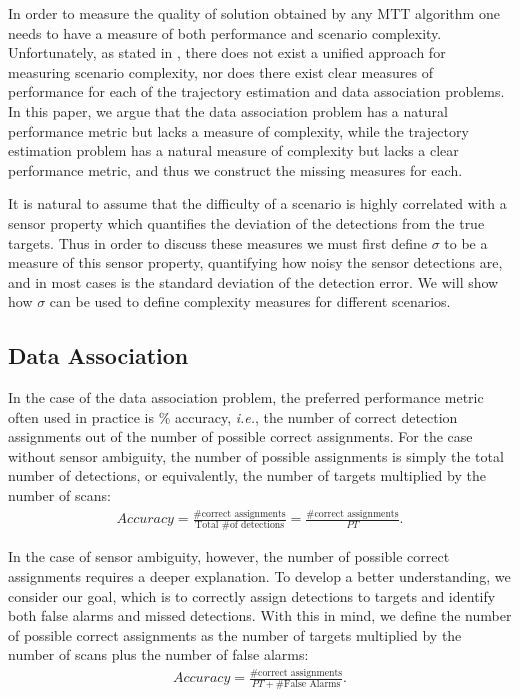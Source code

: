 
In order to measure the quality of solution obtained by any MTT algorithm one needs to have a measure of both performance and scenario complexity. Unfortunately, as stated in \cite{MTT-Taxonomy},
there does not exist a unified approach for measuring scenario complexity, nor does there exist clear measures of performance for each of the trajectory estimation and data association problems. In this paper, we argue that the data association problem has a natural performance metric but lacks a measure of complexity, while the trajectory estimation problem has a natural measure of complexity but lacks a clear performance metric, and thus we construct the missing measures for each.

It is natural to assume that the difficulty of a scenario is highly correlated with a sensor property which quantifies the deviation of the detections from the true targets. Thus in order to discuss these measures we must first define $\sigma$ to be a measure of this sensor property, quantifying how noisy the sensor detections are, and in most cases is the standard deviation of the detection error. We will show how $\sigma$ can be used to define complexity measures for different scenarios.

\subsection{Data Association}
In the case of the data association problem, the preferred performance metric often used in practice is \% accuracy, \textit{i.e.}, the number of correct detection assignments out of the number of possible correct assignments. For the case without sensor ambiguity, the number of possible assignments is simply the total number of detections, or equivalently, the number of targets multiplied by the number of scans: 
\begin{align*}
Accuracy =  \frac{\text{\# correct assignments}}{\text{Total \# of detections}}= \frac{\text{\# correct assignments}}{PT}.
\end{align*}

In the case of sensor ambiguity, however, the number of possible correct assignments requires a deeper explanation. To develop a better understanding, we consider our goal, which is to correctly assign detections to targets and identify both false alarms and missed detections. With this in mind, we define the number of possible correct assignments as the number of targets multiplied by the number of scans plus the number of false alarms:
\begin{align*}
Accuracy =  \frac{\text{\# correct assignments}}{PT + \text{\# False Alarms}}.
\end{align*}

